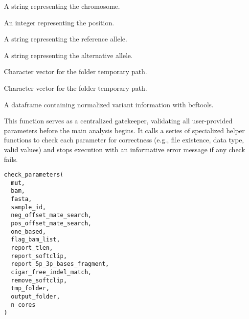 \documentclass[a4paper]{book}
\begin{document}
\begin{Arguments}
\begin{ldescription}
\item[\code{chr}] A string representing the chromosome.

\item[\code{pos}] An integer representing the position.

\item[\code{ref}] A string representing the reference allele.

\item[\code{alt}] A string representing the alternative allele.

\item[\code{fasta}] Character vector for the folder temporary path.

\item[\code{tmp\_folder}] Character vector for the folder temporary path.
\end{ldescription}
\end{Arguments}
%
\begin{Value}
A dataframe containing normalized variant information with bcftools.
\end{Value}
%
\begin{Description}
This function serves as a centralized gatekeeper, validating all user-provided parameters before the main
analysis begins. It calls a series of specialized  helper functions to check each parameter for correctness (e.g., file existence,
data type, valid values) and stops execution with an informative error message if any check fails.
\end{Description}
%
\begin{Usage}
\begin{verbatim}
check_parameters(
  mut,
  bam,
  fasta,
  sample_id,
  neg_offset_mate_search,
  pos_offset_mate_search,
  one_based,
  flag_bam_list,
  report_tlen,
  report_softclip,
  report_5p_3p_bases_fragment,
  cigar_free_indel_match,
  remove_softclip,
  tmp_folder,
  output_folder,
  n_cores
)
\end{verbatim}
\end{Usage}
%
\end{document}
